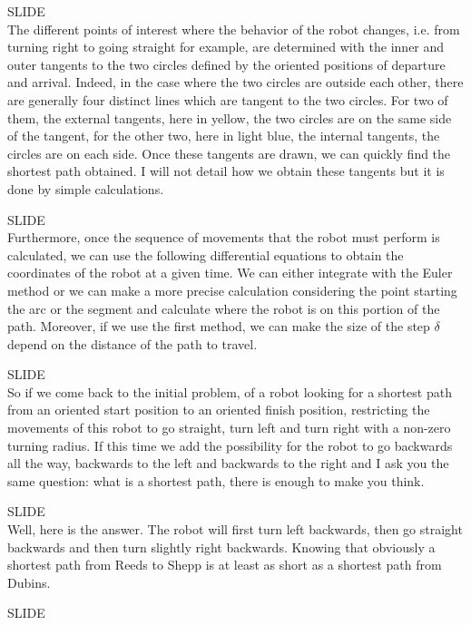 \documentclass[12pt,a4paper]{article}
\newcommand{\slide}{\vspace{0.6cm}SLIDE\\}
\begin{document}
	\slide
	
	The different points of interest where the behavior of the robot changes, i.e. from turning right to going straight for example, are determined with the inner and outer tangents to the two circles defined by the oriented positions of departure and arrival. Indeed, in the case where the two circles are outside each other, there are generally four distinct lines which are tangent to the two circles. For two of them, the external tangents, here in yellow, the two circles are on the same side of the tangent, for the other two, here in light blue, the internal tangents, the circles are on each side. Once these tangents are drawn, we can quickly find the shortest path obtained. I will not detail how we obtain these tangents but it is done by simple calculations.%
	
	\slide
	
	Furthermore, once the sequence of movements that the robot must perform is calculated, we can use the following differential equations to obtain the coordinates of the robot at a given time. We can either integrate with the Euler method or we can make a more precise calculation considering the point starting the arc or the segment and calculate where the robot is on this portion of the path. Moreover, if we use the first method, we can make the size of the step $\delta$ depend on the distance of the path to travel.
	
	\slide
	
	So if we come back to the initial problem, of a robot looking for a shortest path from an oriented start position to an oriented finish position, restricting the movements of this robot to go straight, turn left and turn right with a non-zero turning radius. If this time we add the possibility for the robot to go backwards all the way, backwards to the left and backwards to the right and I ask you the same question: what is a shortest path, there is enough to make you think.
	
	\slide
	
	Well, here is the answer. The robot will first turn left backwards, then go straight backwards and then turn slightly right backwards. Knowing that obviously a shortest path from Reeds to Shepp is at least as short as a shortest path from Dubins.
	
	\slide
	
\end{document}
